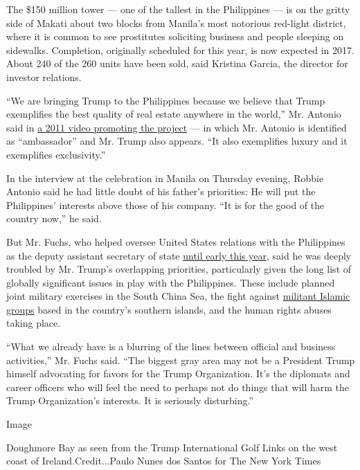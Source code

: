The \$150 million tower --- one of the tallest in the Philippines --- is
on the gritty side of Makati about two blocks from Manila's most
notorious red-light district, where it is common to see prostitutes
soliciting business and people sleeping on sidewalks. Completion,
originally scheduled for this year, is now expected in 2017. About 240
of the 260 units have been sold, said Kristina Garcia, the director for
investor relations.

``We are bringing Trump to the Philippines because we believe that Trump
exemplifies the best quality of real estate anywhere in the world,'' Mr.
Antonio said in \href{https://www.youtube.com/watch?v=aKgI4C4EfZg}{a
2011 video promoting the project} --- in which Mr. Antonio is identified
as ``ambassador'' and Mr. Trump also appears. ``It also exemplifies
luxury and it exemplifies exclusivity.''

In the interview at the celebration in Manila on Thursday evening,
Robbie Antonio said he had little doubt of his father's priorities: He
will put the Philippines' interests above those of his company. ``It is
for the good of the country now,'' he said.

But Mr. Fuchs, who helped oversee United States relations with the
Philippines as the deputy assistant secretary of state
\href{https://www.americanprogress.org/press/release/2016/01/20/129095/release-former-deputy-assistant-secretary-of-state-michael-fuchs-joins-cap-as-senior-fellow/}{until
early this year}, said he was deeply troubled by Mr. Trump's overlapping
priorities, particularly given the long list of globally significant
issues in play with the Philippines. These include planned joint
military exercises in the South China Sea, the fight against
\href{http://www.nytimes.com/2016/08/31/world/asia/philippines-abu-sayyaf-jolo.html}{militant
Islamic groups} based in the country's southern islands, and the human
rights abuses taking place.

``What we already have is a blurring of the lines between official and
business activities,'' Mr. Fuchs said. ``The biggest gray area may not
be a President Trump himself advocating for favors for the Trump
Organization. It's the diplomats and career officers who will feel the
need to perhaps not do things that will harm the Trump Organization's
interests. It is seriously disturbing.''

Image

Doughmore Bay as seen from the Trump International Golf Links on the
west coast of Ireland.Credit...Paulo Nunes dos Santos for The New York
Times

